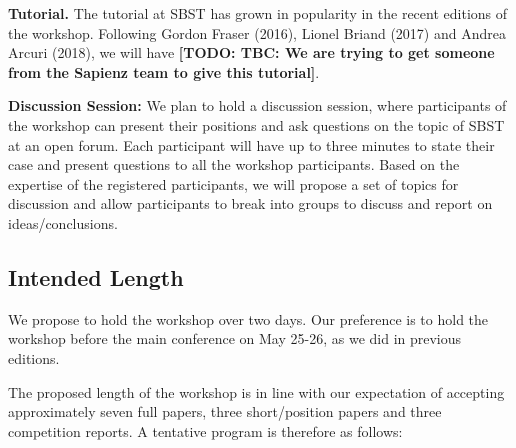 \documentclass[10pt,conference]{IEEEtran}
\newcommand{\TODO}[1]{\textbf{\textcolor{ScarletRed}{[TODO: #1]}}\xspace}
\newcommand{\TODO}[1]{}
\begin{document}
{\bf Tutorial.} The tutorial at SBST has grown in popularity in the
recent editions of the workshop. Following Gordon Fraser (2016),
Lionel Briand (2017) and Andrea Arcuri (2018), we will have \TODO{TBC:
  We are trying to get someone from the Sapienz team to give this
  tutorial}.

{\bf Discussion Session:} We plan to hold a discussion session, where
participants of the workshop can present their positions and ask
questions on the topic of SBST at an open forum. Each participant will
have up to three minutes to state their case and present questions to
all the workshop participants. Based on the expertise of the
registered participants, we will propose a set of topics for
discussion and allow participants to break into groups to discuss and
report on ideas/conclusions.

\subsection{Intended Length} We propose to hold the workshop over two
days. Our preference is to hold the workshop before the main
conference on May 25-26, as we did in previous editions.

The proposed length of the workshop is in line with our expectation of
accepting approximately seven full papers, three short/position papers
and three competition reports. A tentative program is therefore as
follows:
\end{document}
